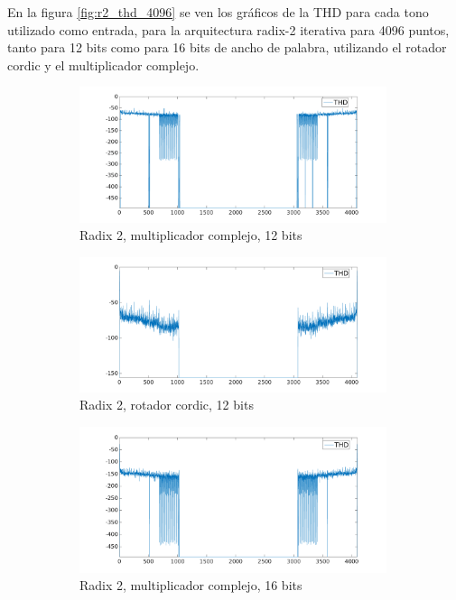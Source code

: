 En la figura \ref{fig:r2_thd_4096} se ven los gráficos de la THD para cada tono utilizado como
entrada, para la arquitectura radix-2 iterativa para 4096 puntos, tanto para 12 bits como para 16 bits de
ancho de palabra, utilizando el rotador cordic y el multiplicador complejo.

\begin{figure}[htbp!]
        \advance\leftskip-1.5cm
        \begin{subfigure}{0.6\textwidth}%
        \includegraphics[width=9cm]{./figures/thd_r2_4096_12_mul.png}
        \caption{Radix 2, multiplicador complejo, 12 bits}
        \end{subfigure}%
        \begin{subfigure}{0.6\textwidth}%
        \includegraphics[width=9cm]{./figures/thd_r2_4096_12_cor.png}
        \caption{Radix 2, rotador cordic, 12 bits}
        \end{subfigure} 
        \begin{subfigure}{0.6\textwidth}%
        \includegraphics[width=9cm]{./figures/thd_r2_4096_16_mul.png}
        \caption{Radix 2, multiplicador complejo, 16 bits}
        \end{subfigure}%
        \begin{subfigure}{0.6\textwidth}%

\end{subfigure}
\end{figure}
